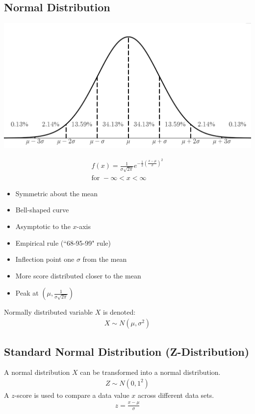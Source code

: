 \documentclass[10pt, a4paper, titlepage]{article}
\begin{document}
\begin{multicols*}{3}
	\dotfill
	\subsection{Normal Distribution}
	\begin{center}
		\includegraphics[width=0.9\linewidth]{normal_distribution.png}\\
	\end{center}
	\begin{align}
		f(x)=\frac{1}{\sigma \sqrt{2\pi}}e^{-\frac{1}{2}\left(\frac{x-\mu}{\sigma}\right)^2}\\
		\text{for }-\infty <x<\infty
	\end{align}
	\begin{itemize}
		\item Symmetric about the mean
		\item Bell-shaped curve
		\item Asymptotic to the $x$-axis
		\item Empirical rule (``68-95-99" rule)
		\item Inflection point one $\sigma$ from the mean
		\item More score distributed closer to the mean
		\item Peak at $(\mu ,\frac{1}{\sigma \sqrt{2\pi}})$
	\end{itemize}
	Normally distributed variable $X$ is denoted:
	\begin{align}
		X\sim N(\mu ,\sigma ^2)
	\end{align}

	\dotfill
	\subsection{Standard Normal Distribution (Z-Distribution)}
	A normal distribution $X$ can be transformed into a normal distribution.
	\begin{align}
		Z\sim N(0,1^2)
	\end{align}
	A $z$-score is used to compare a data value $x$ across different data sets.
	\begin{align}
		z=\frac{x-\mu}{\sigma}
	\end{align}



\end{multicols*}
\end{document}
